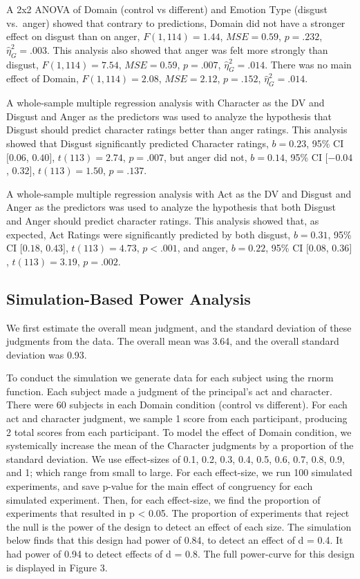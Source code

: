 \documentclass[man]{apa6}
\begin{document}
A 2x2 ANOVA of Domain (control vs different) and Emotion Type (disgust
vs.~anger) showed that contrary to predictions, Domain did not have a
stronger effect on disgust than on anger, \(F(1, 114) = 1.44\),
\(\mathit{MSE} = 0.59\), \(p = .232\), \(\hat{\eta}^2_G = .003\). This
analysis also showed that anger was felt more strongly than disgust,
\(F(1, 114) = 7.54\), \(\mathit{MSE} = 0.59\), \(p = .007\),
\(\hat{\eta}^2_G = .014\). There was no main effect of Domain,
\(F(1, 114) = 2.08\), \(\mathit{MSE} = 2.12\), \(p = .152\),
\(\hat{\eta}^2_G = .014\).

A whole-sample multiple regression analysis with Character as the DV and
Disgust and Anger as the predictors was used to analyze the hypothesis
that Disgust should predict character ratings better than anger ratings.
This analysis showed that Disgust significantly predicted Character
ratings, \(b = 0.23\), 95\% CI \([0.06\), \(0.40]\), \(t(113) = 2.74\),
\(p = .007\), but anger did not, \(b = 0.14\), 95\% CI \([-0.04\),
\(0.32]\), \(t(113) = 1.50\), \(p = .137\).

A whole-sample multiple regression analysis with Act as the DV and
Disgust and Anger as the predictors was used to analyze the hypothesis
that both Disgust and Anger should predict character ratings. This
analysis showed that, as expected, Act Ratings were significantly
predicted by both disgust, \(b = 0.31\), 95\% CI \([0.18\), \(0.43]\),
\(t(113) = 4.73\), \(p < .001\), and anger, \(b = 0.22\), 95\% CI
\([0.08\), \(0.36]\), \(t(113) = 3.19\), \(p = .002\).

\subsection{Simulation-Based Power
Analysis}\label{simulation-based-power-analysis}

We first estimate the overall mean judgment, and the standard deviation
of these judgments from the data. The overall mean was 3.64, and the
overall standard deviation was 0.93.

To conduct the simulation we generate data for each subject using the
rnorm function. Each subject made a judgment of the principal's act and
character. There were 60 subjects in each Domain condition (control vs
different). For each act and character judgment, we sample 1 score from
each participant, producing 2 total scores from each participant. To
model the effect of Domain condition, we systemically increase the mean
of the Character judgments by a proportion of the standard deviation. We
use effect-sizes of 0.1, 0.2, 0.3, 0.4, 0.5, 0.6, 0.7, 0.8, 0.9, and 1;
which range from small to large. For each effect-size, we run 100
simulated experiments, and save p-value for the main effect of
congruency for each simulated experiment. Then, for each effect-size, we
find the proportion of experiments that resulted in p \textless{} 0.05.
The proportion of experiments that reject the null is the power of the
design to detect an effect of each size. The simulation below finds that
this design had power of 0.84, to detect an effect of d = 0.4. It had
power of 0.94 to detect effects of d = 0.8. The full power-curve for
this design is displayed in Figure 3.
\end{document}
